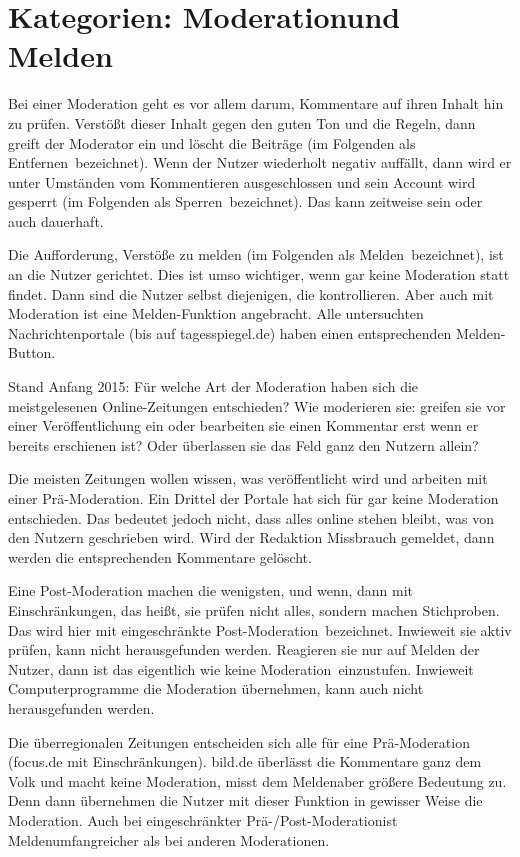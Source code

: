 \section{Kategorien: \glqq Moderation\grqq und \glqq Melden\grqq}

Bei einer Moderation geht es vor allem darum, Kommentare auf ihren Inhalt hin zu
prüfen. Verstößt dieser Inhalt gegen den guten Ton und die Regeln, dann greift
der Moderator ein und löscht die Beiträge (im Folgenden als \glqq
Entfernen\grqq\ bezeichnet). Wenn der Nutzer wiederholt negativ auffällt, dann
wird er unter Umständen vom Kommentieren ausgeschlossen und sein Account wird
gesperrt (im Folgenden als  \glqq Sperren\grqq\ bezeichnet). Das kann zeitweise
sein oder auch dauerhaft.

Die Aufforderung, Verstöße zu melden (im Folgenden als \glqq Melden\grqq\
bezeichnet), ist an die Nutzer gerichtet. Dies ist umso wichtiger, wenn gar
keine Moderation statt findet. Dann sind die Nutzer selbst diejenigen, die
kontrollieren. Aber auch mit Moderation ist eine Melden-Funktion angebracht.
Alle  untersuchten Nachrichtenportale (bis auf tagesspiegel.de) haben einen
entsprechenden Melden-Button.

Stand Anfang 2015: Für welche Art der Moderation haben sich die meistgelesenen
Online-Zeitungen entschieden? Wie moderieren sie: greifen sie vor einer
Veröffentlichung ein oder bearbeiten sie einen Kommentar erst wenn er bereits
erschienen ist? Oder überlassen sie das Feld ganz den Nutzern allein?

Die meisten Zeitungen wollen wissen, was veröffentlicht wird und arbeiten mit
einer Prä-Moderation.
Ein Drittel der Portale hat sich für gar keine Moderation entschieden. Das
bedeutet jedoch nicht, dass alles online stehen bleibt, was von den Nutzern
geschrieben wird. Wird der Redaktion Missbrauch gemeldet, dann werden die
entsprechenden Kommentare gelöscht.

Eine Post-Moderation machen die wenigsten, und wenn, dann mit Einschränkungen,
das heißt, sie prüfen nicht alles, sondern machen Stichproben. Das wird hier mit
\glqq eingeschränkte Post-Moderation\grqq\ bezeichnet. Inwieweit sie aktiv prüfen,
kann nicht herausgefunden werden. Reagieren sie nur auf Melden der Nutzer, dann
ist das eigentlich wie \glqq keine Moderation\grqq\ einzustufen.
Inwieweit Computerprogramme die Moderation übernehmen, kann auch nicht
herausgefunden werden.

Die überregionalen Zeitungen entscheiden sich alle für eine Prä-Moderation
(focus.de mit Einschränkungen). bild.de überlässt die Kommentare ganz dem Volk
und macht keine Moderation, misst dem \glqq Melden\grqq aber größere Bedeutung
zu. Denn dann übernehmen die Nutzer mit dieser Funktion in gewisser Weise die
Moderation. Auch bei \glqq eingeschränkter Prä-/Post-Moderation\grqq ist \glqq
Melden\grqq umfangreicher als bei anderen Moderationen.


